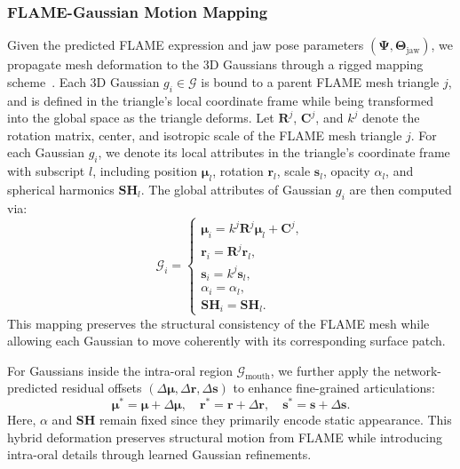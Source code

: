 \subsubsection{FLAME-Gaussian Motion Mapping}
\label{sec:flame_gaussian}
Given the predicted FLAME expression and jaw pose parameters $(\boldsymbol{\Psi}, \boldsymbol{\Theta}_{\text{jaw}})$, we propagate mesh deformation to the 3D Gaussians through a rigged mapping scheme~\cite{qian2024gaussianavatars}. Each 3D Gaussian \(g_i \in \mathcal{G}\) is bound to a parent FLAME mesh triangle \(j\), and is defined in the triangle’s local coordinate frame while being transformed into the global space as the triangle deforms. Let \(\mathbf{R}^j\), \(\mathbf{C}^j\), and \(k^j\) denote the rotation matrix, center, and isotropic scale of the FLAME mesh triangle \(j\). For each Gaussian \(g_i\), we denote its local attributes in the triangle's coordinate frame with subscript \(l\), including position \(\boldsymbol{\mu}_l\), rotation \(\boldsymbol{r}_l\), scale \(\boldsymbol{s}_l\), opacity \(\alpha_l\), and spherical harmonics \(\mathbf{SH}_l\). The global attributes of Gaussian \(g_i\) are then computed via:
\begin{equation}
\mathcal{G}_i =
\begin{cases}
\boldsymbol{\mu}_i = k^j \mathbf{R}^j \boldsymbol{\mu}_l + \mathbf{C}^j,\\[2pt]
\boldsymbol{r}_i = \mathbf{R}^j \boldsymbol{r}_l,\\[2pt]
\boldsymbol{s}_i = k^j \boldsymbol{s}_l,\\[2pt]
\alpha_i = \alpha_l,\\[2pt]
\mathbf{SH}_i = \mathbf{SH}_l.
\end{cases}
\label{eq:rigged-gaussian}
\end{equation}
This mapping preserves the structural consistency of the FLAME mesh while allowing each Gaussian to move coherently with its corresponding surface patch. 

For Gaussians inside the intra-oral region $\mathcal{G}_{\text{mouth}}$, we further apply the network-predicted residual offsets $(\Delta\boldsymbol{\mu}, \Delta\boldsymbol{r}, \Delta\boldsymbol{s})$ to enhance fine-grained articulations:
\begin{equation}
\boldsymbol{\mu}^* = \boldsymbol{\mu} + \Delta\boldsymbol{\mu}, \quad
\boldsymbol{r}^* = \boldsymbol{r} + \Delta\boldsymbol{r}, \quad
\boldsymbol{s}^* = \boldsymbol{s} + \Delta\boldsymbol{s}.
\label{eq:residual-gaussian}
\end{equation}
Here, $\alpha$ and $\mathbf{SH}$ remain fixed since they primarily encode static appearance. This hybrid deformation preserves structural motion from FLAME while introducing intra-oral details through learned Gaussian refinements.


